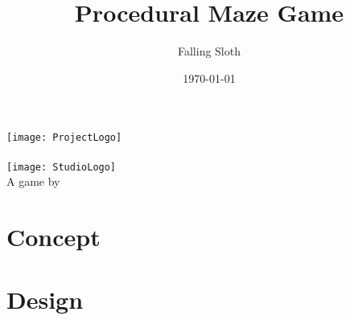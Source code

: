 \documentclass[12pt,a4paper]{article}
\title{Procedural Maze Game}
\author{Falling Sloth}
\date{\today}
\begin{document}

\begin{titlepage}
	\vspace*{\fill}
	\centering
	\texttt{[image: ProjectLogo]}\\[.5cm]
	{\Large \thetitle}\\[1cm]
	\texttt{[image: StudioLogo]}\\[.5cm]
	{\large A game by \theauthor}\\[1cm]
	{\thedate}
	\vspace*{\fill}
\end{titlepage}

\tableofcontents
\pagebreak

\lfoot{\theauthor}\cfoot{\thetitle}

\section{Concept}


\section{Design}

\end{document}
